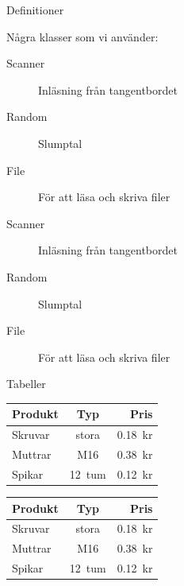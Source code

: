 \begin{Slide}{Definitioner}


  \begin{exlatex}
Några klasser som vi använder:

\begin{description}
  \item[Scanner] Inläsning från tangentbordet
  \item[Random] Slumptal
  \item[File] För att läsa och skriva filer
\end{description}
  \end{exlatex}
\begin{description}
  \item[Scanner] Inläsning från tangentbordet
  \item[Random] Slumptal
  \item[File] För att läsa och skriva filer
\end{description}


\end{Slide}

\begin{Slide}{Tabeller}
  
  \begin{itemize}
  \end{itemize}
  \vspace{1em}

  \begin{exlatex}
\begin{tabular}{lcr}
  Produkt & Typ    & Pris    \\
  \hline
  Skruvar & stora  & 0.18~kr \\
  Muttrar & M16    & 0.38~kr \\
  Spikar  & 12~tum & 0.12~kr
\end{tabular}
  \end{exlatex}
\begin{tabular}{lcr}
  Produkt & Typ    & Pris    \\
  \hline
  Skruvar & stora  & 0.18~kr \\
  Muttrar & M16    & 0.38~kr \\
  Spikar  & 12~tum & 0.12~kr
\end{tabular}

\end{Slide}

